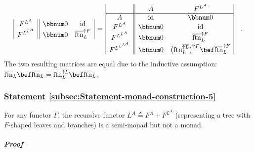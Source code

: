 \begin{align*}
\begin{array}{|c||cc|}
F^{L^{A}} & \bbnum 0 & \text{id}\\
F^{L^{L^{A}}} & \bbnum 0 & \overline{\text{ftn}}_{L}^{\uparrow F}
\end{array}\,=\,\begin{array}{|c||cc|}
 & A & F^{L^{A}}\\
\hline A & \text{id} & \bbnum 0\\
F^{L^{A}} & \bbnum 0 & \text{id}\\
F^{L^{L^{A}}} & \bbnum 0 & \overline{\text{ftn}}_{L}^{\uparrow F}\\
F^{L^{L^{L^{A}}}} & \bbnum 0 & \big(\text{ftn}_{L}^{\overline{\uparrow L}}\big)^{\uparrow F}\bef\overline{\text{ftn}}_{L}^{\uparrow F}
\end{array}\quad.
\end{align*}
The two resulting matrices are equal due to the inductive assumption:
$\overline{\text{ftn}}_{L}\bef\overline{\text{ftn}}_{L}=\text{ftn}_{L}^{\overline{\uparrow L}}\bef\overline{\text{ftn}}_{L}$.

\subsubsection{Statement \label{subsec:Statement-monad-construction-5}\ref{subsec:Statement-monad-construction-5}}

For any functor $F$, the recursive functor $L^{A}\triangleq F^{A}+F^{L^{A}}$
(representing a tree with $F$-shaped leaves and branches) is a semi-monad
but not a monad.

\subparagraph{Proof}

